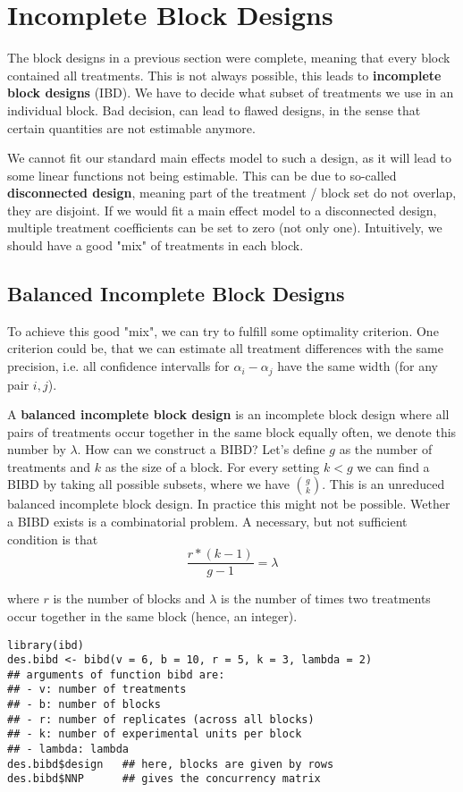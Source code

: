 \section{Incomplete Block Designs}

The block designs in a previous section were complete, meaning that every block contained all treatments. This is not always possible, this leads to \textbf{incomplete block designs} (IBD). We have to decide what subset of treatments we use in an individual block. Bad decision, can lead to flawed designs, in the sense that certain quantities are not estimable anymore. \medskip

We cannot fit our standard main effects model to such a design, as it will lead to some linear functions not being estimable. This can be due to so-called \textbf{disconnected design}, meaning part of the treatment / block set do not overlap, they are disjoint. If we would fit a main effect model to a disconnected design, multiple treatment coefficients can be set to zero (not only one). Intuitively, we should have a good "mix" of treatments in each block.\medskip


\subsection{Balanced Incomplete Block Designs}

To achieve this good "mix",  we can try to fulfill some optimality criterion. One criterion could be, that we can estimate all treatment differences with the same precision, i.e. all confidence intervalls for $\alpha_i - \alpha_j$ have the same width (for any pair $i,j$).\medskip

A \textbf{balanced incomplete block design} is an incomplete block design where all pairs of treatments occur together in the same block equally often, we denote this number by $\lambda$.  How can we construct a BIBD? Let's define $g$ as the number of treatments and $k$ as the size of a block. For every setting $k < g$ we can find a BIBD by taking all possible subsets, where we have $\binom{g}{k}$. This is an unreduced balanced incomplete block design. In practice this might not be possible. Wether a BIBD exists is a combinatorial problem. A necessary, but not sufficient condition is that 
$$\frac{r * (k - 1)}{g - 1} = \lambda$$

where $r$ is the number of blocks and $\lambda$ is the number of times two treatments occur together in the same block (hence, an integer). 

\begin{lstlisting}
library(ibd)
des.bibd <- bibd(v = 6, b = 10, r = 5, k = 3, lambda = 2) 
## arguments of function bibd are:
## - v: number of treatments
## - b: number of blocks
## - r: number of replicates (across all blocks)
## - k: number of experimental units per block
## - lambda: lambda
des.bibd$design   ## here, blocks are given by rows
des.bibd$NNP      ## gives the concurrency matrix
\end{lstlisting}

